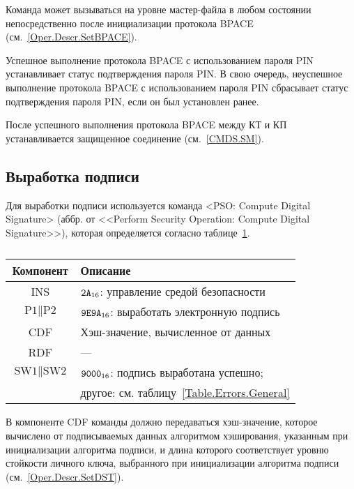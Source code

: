 Команда может вызываться на уровне мастер-файла в любом состоянии
непосредственно после инициализации протокола 
BPACE (см.~\ref{Oper.Descr.SetBPACE}).

Успешное выполнение протокола BPACE с использованием пароля PIN 
устанавливает статус подтверждения пароля PIN.
В свою очередь, неуспешное выполнение протокола BPACE с использованием 
пароля PIN сбрасывает статус подтверждения пароля PIN, 
если он был установлен ранее.

После успешного выполнения протокола BPACE между КТ и КП 
устанавливается защищенное соединение (см.~\ref{CMDS.SM}).

\subsection{Выработка подписи}
\label{Oper.Descr.Signature}

Для выработки подписи используется 
команда <PSO: Compute Digital Signature>
(аббр. от <<Perform Security Operation: Compute Digital Signature>>),
которая определяется согласно 
таблице~\ref{Table.Oper.SignatureCmd}.

\begin{table}[hbt]
\caption{}\label{Table.Oper.SignatureCmd}
\begin{tabular}{|c|p{14cm}|}
\hline
Компонент & Описание\\ 
\hline
\hline
INS & $\texttt{2A}_{16}$: управление средой безопасности \\
\hline
$\text{P1} \parallel \text{P2}$ & $\texttt{9E9A}_{16}$: выработать
электронную подпись \\ 
\hline
CDF & Хэш-значение, вычисленное от данных\\
\hline 
RDF &  --- \\
\hline
$\text{SW1} \parallel \text{SW2}$ & 
  $\texttt{9000}_{16}$: подпись выработана успешно; \\
  & другое: см. таблицу~\ref{Table.Errors.General} \\
\hline
\end{tabular}
\end{table}

В компоненте CDF команды должно передаваться хэш-значение, которое вычислено
от подписываемых данных алгоритмом хэширования, указанным 
при инициализации алгоритма подписи, и длина которого соответствует
уровню стойкости личного ключа, выбранного при инициализации 
алгоритма подписи (см.~\ref{Oper.Descr.SetDST}).

